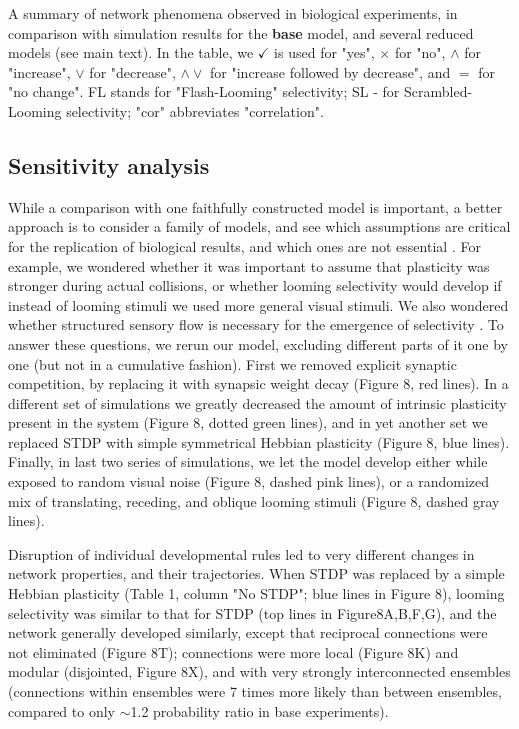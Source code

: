 \documentclass{article}
\begin{document}
\begin{table}
    
    \caption{A summary of network phenomena observed in biological experiments, in comparison with simulation results for the \textbf{base} model, and several reduced models (see main text). In the table, we $\checkmark$ is used for "yes", $\times$ for "no", $\land$ for "increase", $\lor$ for "decrease", $\land \lor$ for "increase followed by decrease", and $=$ for "no change". FL stands for "Flash-Looming" selectivity; SL - for Scrambled-Looming selectivity; "cor" abbreviates "correlation".}
\end{table}

\subsection*{Sensitivity analysis}

While a comparison with one faithfully constructed model is important, a better approach is to consider a family of models, and see which assumptions are critical for the replication of biological results, and which ones are not essential \citep{linderman2017constrain, pauli2018repro}. For example, we wondered whether it was important to assume that plasticity was stronger during actual collisions, or whether looming selectivity would develop if instead of looming stimuli we used more general visual stimuli. We also wondered whether structured sensory flow is necessary for the emergence of selectivity \citep{triplett2018emergence}. To answer these questions, we rerun our model, excluding different parts of it one by one (but not in a cumulative fashion). First we removed explicit synaptic competition, by replacing it with synapsic weight decay (Figure 8, red lines). In a different set of simulations we greatly decreased the amount of intrinsic plasticity present in the system (Figure 8, dotted green lines), and in yet another set we replaced STDP with simple symmetrical Hebbian plasticity (Figure 8, blue lines). Finally, in last two series of simulations, we let the model develop either while exposed to random visual noise (Figure 8, dashed pink lines), or a randomized mix of translating, receding, and oblique looming stimuli (Figure 8, dashed gray lines).

Disruption of individual developmental rules led to very different changes in network properties, and their trajectories. When STDP was replaced by a simple Hebbian plasticity (Table 1, column "No STDP"; blue lines in Figure 8), looming selectivity was similar to that for STDP (top lines in Figure8A,B,F,G), and the network generally developed similarly, except that reciprocal connections were not eliminated (Figure 8T); connections were more local (Figure 8K) and modular (disjointed, Figure 8X), and with very strongly interconnected ensembles (connections within ensembles were 7 times more likely than between ensembles, compared to only $\sim$1.2 probability ratio in base experiments).
\end{document}
